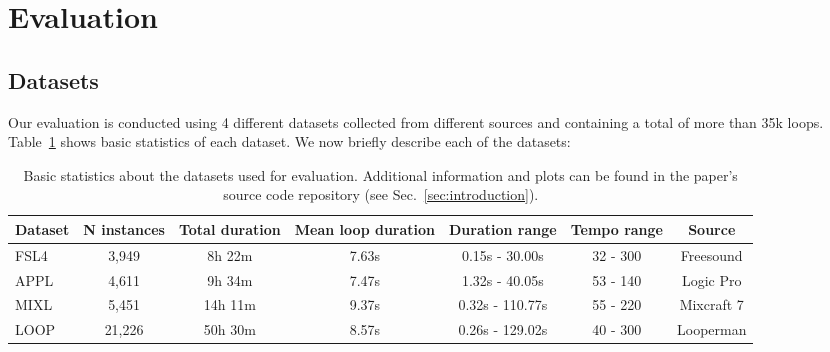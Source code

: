 \documentclass{article}
\begin{document}
\section{Evaluation}\label{sec:evaluation_methodology}

\subsection{Datasets}\label{sec:datasets}
Our evaluation is conducted using 4 different datasets collected from different sources and containing a total of more than 35k loops.
Table~\ref{tab:datasets} shows basic statistics of each dataset. We now briefly describe each of the datasets:

\begin{table}
    \begin{center}
    \begin{tabular}{ l c c c c c c}
    Dataset & N instances & Total duration & Mean loop duration & Duration range & Tempo range & Source \\ \hline 
    FSL4 & 3,949 & 8h 22m & 7.63s & 0.15s - 30.00s & 32 - 300 & Freesound \\ 
    APPL & 4,611 & 9h 34m & 7.47s & 1.32s - 40.05s & 53 - 140 & Logic Pro \\ 
    MIXL & 5,451 & 14h 11m & 9.37s & 0.32s - 110.77s & 55 - 220 & Mixcraft 7 \\ 
    LOOP & 21,226 & 50h 30m & 8.57s & 0.26s - 129.02s & 40 - 300 & Looperman
    \end{tabular} 
    \end{center}
    \caption{Basic statistics about the datasets used for evaluation. Additional information and plots can be found in the paper's source code repository (see Sec.~\ref{sec:introduction}).}
    \label{tab:datasets}
\end{table}

\end{document}
